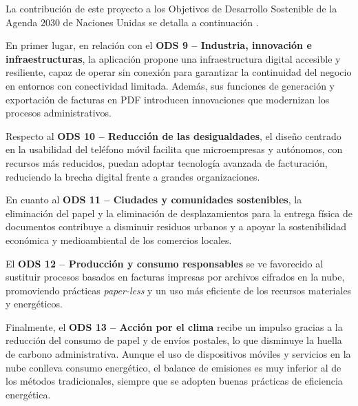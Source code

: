 \begin{large}
La contribución de este proyecto a los Objetivos de Desarrollo Sostenible de la Agenda 2030 de Naciones Unidas se detalla a continuación \cite{un_agenda2030,sdg_report2023}.

En primer lugar, en relación con el \textbf{ODS 9 – Industria, innovación e infraestructuras}, la aplicación propone una infraestructura digital accesible y resiliente, capaz de operar sin conexión para garantizar la continuidad del negocio en entornos con conectividad limitada. Además, sus funciones de generación y exportación de facturas en PDF introducen innovaciones que modernizan los procesos administrativos. 

Respecto al \textbf{ODS 10 – Reducción de las desigualdades}, el diseño centrado en la usabilidad del teléfono móvil facilita que microempresas y autónomos, con recursos más reducidos, puedan adoptar tecnología avanzada de facturación, reduciendo la brecha digital frente a grandes organizaciones. 

En cuanto al \textbf{ODS 11 – Ciudades y comunidades sostenibles}, la eliminación del papel y la eliminación de desplazamientos para la entrega física de documentos contribuye a disminuir residuos urbanos y a apoyar la sostenibilidad económica y medioambiental de los comercios locales. 

El \textbf{ODS 12 – Producción y consumo responsables} se ve favorecido al sustituir procesos basados en facturas impresas por archivos cifrados en la nube, promoviendo prácticas \textit{paper-less} y un uso más eficiente de los recursos materiales y energéticos. 

Finalmente, el \textbf{ODS 13 – Acción por el clima} recibe un impulso gracias a la reducción del consumo de papel y de envíos postales, lo que disminuye la huella de carbono administrativa. Aunque el uso de dispositivos móviles y servicios en la nube conlleva consumo energético, el balance de emisiones es muy inferior al de los métodos tradicionales, siempre que se adopten buenas prácticas de eficiencia energética.
\end{large}